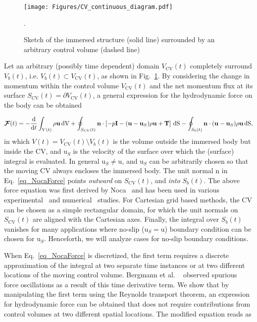 \documentclass[review]{elsarticle}
\renewcommand \d [2]{\frac{{\rm d} #1}{{\rm d} #2}}
\renewcommand{\vec}[1]{\bm{\mathrm{#1}}}
\def \n{\vec{n}}
\def \u{\vec{u}}
\def \uS{\vec{u}_S}
\def \I{\vec{I}}
\def \T{\vec{T}}
\def \Sbt{S_b(t)}
\def  \Scvt{S_\text{CV}(t)}
\def \Vt{V(t)}
\def \Vbt{V_b(t)}
\def  \Vcvt{V_\text{CV}(t)}
\def \cF{\vec{\mathcal{F}}}
\def \I{\vec{I}}
\def \n{\vec{n}}
\def \u{\vec{u}}
\def \dS{\,\mathrm{dS}}
\def \dV{\,\mathrm{dV}}
\def \ndot{\n \cdot}
\begin{document}
\begin{figure}[H]
  \centering
    \texttt{[image: Figures/CV\_continuous\_diagram.pdf]}
  \caption{Sketch of the immersed structure (solid line)
  surrounded by an arbitrary control volume (dashed line)}.
  \label{fig_CV_continuous}
\end{figure}

Let an arbitrary (possibly time dependent) domain $\Vcvt$ completely surround
$\Vbt$, i.e. $\Vbt \subset \Vcvt$, as shown in Fig.~\ref{fig_CV_continuous}. By 
considering the change in momentum within the control volume $\Vcvt$ and the 
net momentum flux at its surface $\Scvt = \partial \Vcvt$, a general expression 
for the hydrodynamic force on the body can be obtained

\begin{equation}
\cF(t) = -\d{}{t} \int_{\Vt} \rho \u \dV + \oint_{\Scvt} \ndot \left[-p \I - (\u-\uS)\rho \u + \T \right] \dS  
- \oint_{\Sbt} \ndot (\u-\uS)\rho \u \dS, \label{eq_NocaForce}        
\end{equation}
in which $\Vt = \Vcvt \setminus \Vbt$ is the volume outside the immersed 
body but inside the CV, and $\uS$ is the velocity of the surface over which the (surface) integral 
is evaluated. In general $\uS \neq \u$, and $\uS$ can be arbitrarily chosen so 
that the moving CV always encloses the immersed body. The unit normal $\n$ in 
Eq.~\eqref{eq_NocaForce} points \emph{outward} on $\Scvt$, and \emph{into}
$\Sbt$. The above force equation was first derived by Noca~\cite{Noca97} and 
has been used in various experimental~\cite{Noca99, Unal97, vanOudheusden07, Jardin09} 
and numerical~\cite{Bergmann11, Bergmann16, Shen09, Sallstrom14} studies.
For Cartesian grid based methods, the CV can be chosen as a 
simple rectangular domain, for which the unit normals on $\Scvt$ are aligned with the
Cartesian axes. Finally, the integral over $\Sbt$ vanishes for many applications 
where no-slip ($\uS = \u$) boundary condition can be chosen for $\uS$.
Henceforth, we will analyze cases for no-slip boundary conditions.

When Eq.~\eqref{eq_NocaForce} is discretized, the first term requires
a discrete approximation of the integral at two separate time instances
or at two different locations of the moving control volume. Bergmann et al.
~\cite{Bergmann11} observed spurious 
force oscillations as a result of this time derivative term. We show that by 
manipulating the first term using the Reynolds transport theorem, 
an expression for hydrodynamic force can be obtained that does not require
contributions from control volumes at two different spatial locations. The 
modified equation reads as
\end{document}
